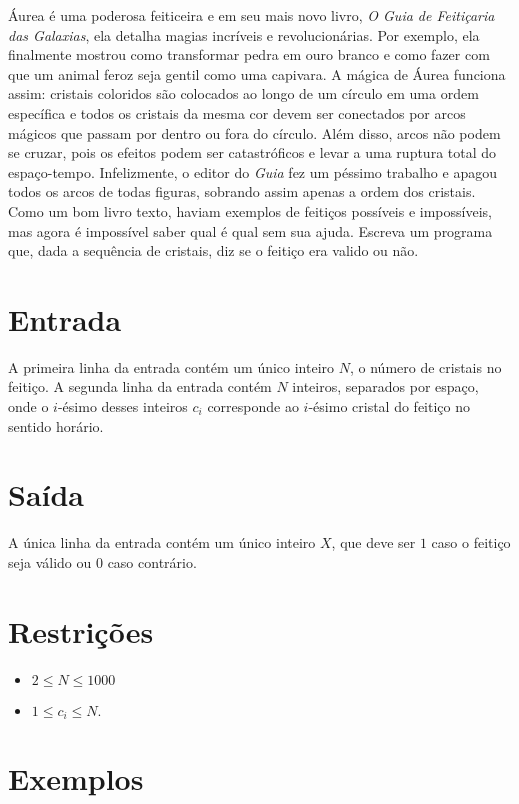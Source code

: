 Áurea é uma poderosa feiticeira e em seu mais novo livro, \textit{O Guia de Feitiçaria das Galaxias}, ela detalha magias 
incríveis e revolucionárias. Por exemplo, ela finalmente mostrou como transformar pedra em ouro branco e como fazer com que um animal feroz
seja gentil como uma capivara. A mágica de Áurea funciona assim: cristais coloridos são colocados ao longo de um círculo em uma ordem
específica e todos os cristais da mesma cor devem ser conectados por arcos mágicos que passam por dentro ou fora do círculo.
Além disso, arcos não podem se cruzar, pois os efeitos podem ser catastróficos e levar a uma ruptura total do espaço-tempo.
Infelizmente, o editor do \textit{Guia} fez um péssimo trabalho e apagou todos os arcos de todas figuras, sobrando assim apenas
a ordem dos cristais. Como um bom livro texto, haviam exemplos de feitiços possíveis e impossíveis, mas agora é impossível saber qual
é qual sem sua ajuda. Escreva um programa que, dada a sequência de cristais, diz se o feitiço era valido ou não.

\section*{Entrada}

A primeira linha da entrada contém um único inteiro $N$, o número de cristais no feitiço.
A segunda linha da entrada contém $N$ inteiros, separados por espaço, onde o $i$-ésimo desses inteiros $c_i$ corresponde ao $i$-ésimo cristal
do feitiço no sentido horário.

\section*{Saída}

A única linha da entrada contém um único inteiro $X$, que deve ser $1$ caso o feitiço seja válido ou $0$ caso contrário.

\section*{Restrições}

\begin{itemize}
    \item $2 \leq N \leq 1000$
    \item $1 \leq c_i \leq N$.
\end{itemize}


\section*{Exemplos}

\exemplo
